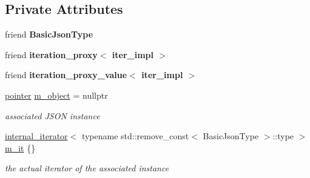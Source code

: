 \subsection*{Private Attributes}
\begin{DoxyCompactItemize}
\item 
\mbox{\label{classnlohmann_1_1detail_1_1iter__impl_abf18f18793f84b0222aebb5a2a87da7a}} 
friend {\bfseries Basic\+Json\+Type}
\item 
\mbox{\label{classnlohmann_1_1detail_1_1iter__impl_a28328d17a18d9754c89c5c8159677a6f}} 
friend {\bfseries iteration\+\_\+proxy$<$ iter\+\_\+impl $>$}
\item 
\mbox{\label{classnlohmann_1_1detail_1_1iter__impl_ac501dc2374b4d17a884fc9a656e80d5a}} 
friend {\bfseries iteration\+\_\+proxy\+\_\+value$<$ iter\+\_\+impl $>$}
\item 
\mbox{\label{classnlohmann_1_1detail_1_1iter__impl_aca84f84be598bdfaaddd23d928c42bbb}} 
\mbox{\hyperlink{classnlohmann_1_1detail_1_1iter__impl_a69e52f890ce8c556fd68ce109e24b360}{pointer}} \mbox{\hyperlink{classnlohmann_1_1detail_1_1iter__impl_aca84f84be598bdfaaddd23d928c42bbb}{m\+\_\+object}} = nullptr
\begin{DoxyCompactList}\small\item\em associated J\+S\+ON instance \end{DoxyCompactList}\item 
\mbox{\label{classnlohmann_1_1detail_1_1iter__impl_a8a86a7c0d4af0cc4ab345b6f0e13cdfa}} 
\mbox{\hyperlink{structnlohmann_1_1detail_1_1internal__iterator}{internal\+\_\+iterator}}$<$ typename std\+::remove\+\_\+const$<$ Basic\+Json\+Type $>$\+::type $>$ \mbox{\hyperlink{classnlohmann_1_1detail_1_1iter__impl_a8a86a7c0d4af0cc4ab345b6f0e13cdfa}{m\+\_\+it}} \{\}
\begin{DoxyCompactList}\small\item\em the actual iterator of the associated instance \end{DoxyCompactList}\end{DoxyCompactItemize}

